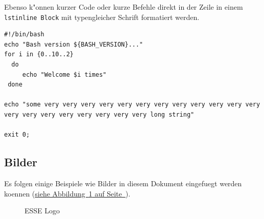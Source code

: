 \documentclass[12pt,a4paper,titlepage,oneside]{scrartcl}
\begin{document}
Ebenso k"onnen kurzer Code oder kurze Befehle direkt in der Zeile in einem \lstinline{lstinline Block} mit typengleicher Schrift formatiert werden.

%

\begin{lstlisting}[caption=Example bash script,label=code:beispiel2,style=simple]
#!/bin/bash
echo "Bash version ${BASH_VERSION}..."
for i in {0..10..2}
  do
     echo "Welcome $i times"
 done

echo "some very very very very very very very very very very very very very very very very very very very very long string"

exit 0;
\end{lstlisting}

\subsection{Bilder}

Es folgen einige Beispiele wie Bilder in diesem Dokument eingefuegt werden koennen
(\hyperref[fig:logo1]{siehe Abbildung~\ref*{fig:logo1} auf Seite~\pageref*{fig:logo1}}).

\begin{figure}[h!]
  \centering
  \caption{ESSE Logo}
  \label{fig:logo1}
\end{figure}
\end{document}
